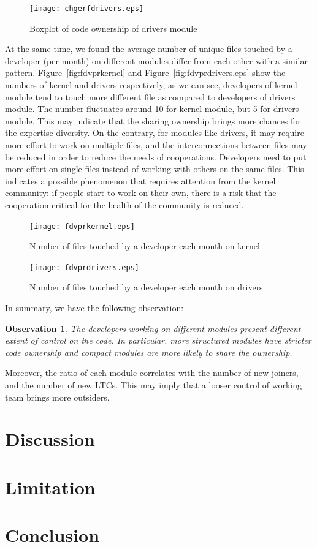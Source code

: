 \documentclass{sig-alternate-05-2015}
\newtheorem{observation}{\bf Observation}
\begin{document}
\begin{figure}
\centering
\texttt{[image: chgerfdrivers.eps]} %
\caption{Boxplot of code ownership of drivers module}
\label{fig:ownershipdrivers}
\end{figure}

At the same time, we found the average number of unique files touched 
by a developer (per month) on different modules differ from each other
with a similar pattern. Figure~\ref{fig:fdvprkernel} and
Figure~\ref{fig:fdvprdrivers.eps} show the numbers of kernel and drivers
respectively, as we can see, developers of kernel module tend to touch
more different file as compared to developers of drivers module.
The number fluctuates around 10 for kernel module, but 5 for drivers module.
This may indicate that the sharing ownership brings more chances for
the expertise diversity.
On the contrary, for modules like drivers,
 it may require more effort to work on multiple files,
and the interconnections between files may be reduced in order to reduce
the needs of cooperations.
Developers need to put more effort on single files
instead of working with others on the same files.
This indicates a possible phenomenon that requires attention from the kernel community:
if people start to work on their own, there is a risk that the cooperation critical
for the health of the community is reduced.


\begin{figure}
\centering
\texttt{[image: fdvprkernel.eps]} %
\caption{Number of files touched by a developer each month on kernel}
\label{fig:productivitykernel}
\end{figure}

\begin{figure}
\centering
\texttt{[image: fdvprdrivers.eps]} %
\caption{Number of files touched by a developer each month on drivers}
\label{fig:productivitydrivers}
\end{figure}

In summary, we have the following observation:
\begin{observation}\label{o:2}
\emph{The developers working on different modules present different extent of control
on the code. In particular, more structured modules have stricter code ownership
and compact modules are more likely to share the ownership.} 
\end{observation}

Moreover, the ratio of each module correlates with the number of new joiners,
and the number of new LTCs. This may imply that a looser control of working team
brings more outsiders.

\section{Discussion}\label{s:discussion}

\section{Limitation}\label{s:limitation}

\section{Conclusion}\label{s:conclusion}


 
\end{document}
